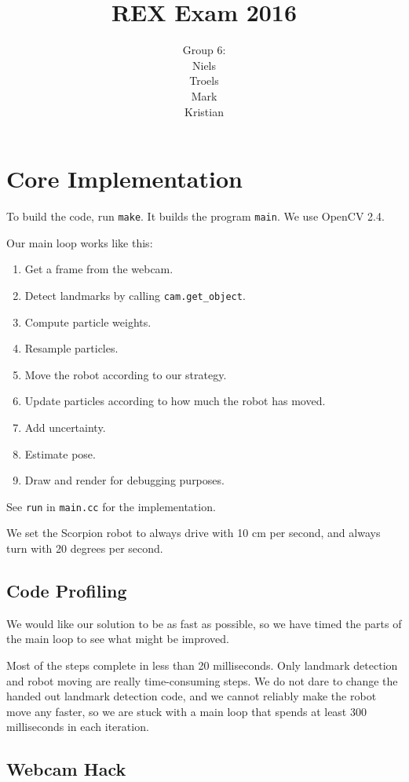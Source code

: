 \documentclass[a4paper,12pt]{article}
\title{REX Exam 2016}
\author{Group 6:\\Niels\\Troels\\Mark\\Kristian}
\begin{document}
\maketitle
\newpage

\section{Core Implementation}

To build the code, run \texttt{make}.  It builds the program \texttt{main}.  We
use OpenCV 2.4.

Our main loop works like this:

\begin{enumerate}
\item Get a frame from the webcam.
\item Detect landmarks by calling \texttt{cam.get_object}.
\item Compute particle weights.
\item Resample particles.
\item Move the robot according to our strategy.
\item Update particles according to how much the robot has moved.
\item Add uncertainty.
\item Estimate pose.
\item Draw and render for debugging purposes.
\end{enumerate}

See \texttt{run} in \texttt{main.cc} for the implementation.

We set the Scorpion robot to always drive with 10 cm per second, and always turn
with 20 degrees per second.


\subsection{Code Profiling}

We would like our solution to be as fast as possible, so we have timed the parts
of the main loop to see what might be improved.

Most of the steps complete in less than 20 milliseconds.  Only landmark
detection and robot moving are really time-consuming steps.  We do not dare to
change the handed out landmark detection code, and we cannot reliably make the
robot move any faster, so we are stuck with a main loop that spends at least 300
milliseconds in each iteration.


\subsection{Webcam Hack}
\end{document}
